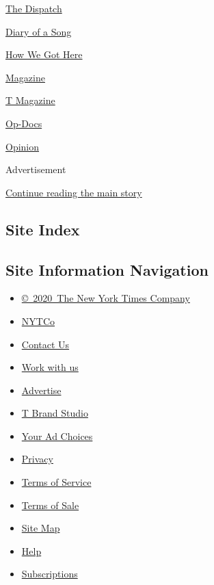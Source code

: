\href{/video/on-the-ground}{The Dispatch}

\href{/video/diaryofasong}{Diary of a Song}

\href{/video/how-we-got-here}{How We Got Here}

\href{/video/magazine}{Magazine}

\href{/video/t-magazine}{T Magazine}

\href{/video/op-docs}{Op-Docs}

\href{/video/opinion}{Opinion}

Advertisement

\protect\hyperlink{after-bottom}{Continue reading the main story}

\hypertarget{site-index}{%
\subsection{Site Index}\label{site-index}}

\hypertarget{site-information-navigation}{%
\subsection{Site Information
Navigation}\label{site-information-navigation}}

\begin{itemize}
\tightlist
\item
  \href{https://help.nytimes.com/hc/en-us/articles/115014792127-Copyright-notice}{©~2020~The
  New York Times Company}
\end{itemize}

\begin{itemize}
\tightlist
\item
  \href{https://www.nytco.com/}{NYTCo}
\item
  \href{https://help.nytimes.com/hc/en-us/articles/115015385887-Contact-Us}{Contact
  Us}
\item
  \href{https://www.nytco.com/careers/}{Work with us}
\item
  \href{https://nytmediakit.com/}{Advertise}
\item
  \href{http://www.tbrandstudio.com/}{T Brand Studio}
\item
  \href{https://www.nytimes.com/privacy/cookie-policy\#how-do-i-manage-trackers}{Your
  Ad Choices}
\item
  \href{https://www.nytimes.com/privacy}{Privacy}
\item
  \href{https://help.nytimes.com/hc/en-us/articles/115014893428-Terms-of-service}{Terms
  of Service}
\item
  \href{https://help.nytimes.com/hc/en-us/articles/115014893968-Terms-of-sale}{Terms
  of Sale}
\item
  \href{https://spiderbites.nytimes.com}{Site Map}
\item
  \href{https://help.nytimes.com/hc/en-us}{Help}
\item
  \href{https://www.nytimes.com/subscription?campaignId=37WXW}{Subscriptions}
\end{itemize}
